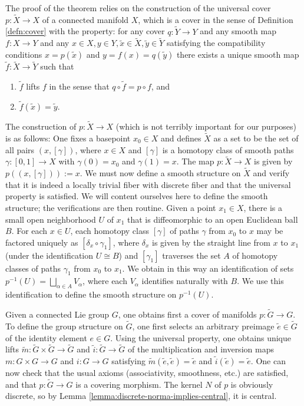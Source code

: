 \documentclass[reqno]{amsart} 
\begin{document}
The proof of the theorem relies on the construction of the universal cover $p : \tilde{X} \rightarrow X$ of a connected manifold $X$, which is a cover in the sense of Definition \ref{defn:cover} with the property: for any cover $q : \tilde{Y} \rightarrow Y$ and any smooth map $f : X \rightarrow Y$ and any $x \in X, y \in Y, \tilde{x} \in \tilde{X}, \tilde{y} \in \tilde{Y}$ satisfying the compatibility conditions $x = p(\tilde{x})$ and $y = f(x) = q(\tilde{y})$ there exists a unique smooth map $\tilde{f} : \tilde{X} \rightarrow \tilde{Y}$ such that
\begin{enumerate}
\item $\tilde{f}$ lifts $f$ in the sense that $q \circ \tilde{f} = p \circ f$, and
\item $\tilde{f}(\tilde{x}) = \tilde{y}$.
\end{enumerate}
The construction of $p : \tilde{X} \rightarrow X$ (which is not terribly important for our purposes) is as follows: One fixes a basepoint $x_0 \in X$ and defines $\tilde{X}$ as a set to be the set of all pairs $(x,[\gamma])$, where $x \in X$ and $[\gamma]$ is a homotopy class of smooth paths $\gamma : [0,1] \rightarrow X$ with $\gamma(0) = x_0$ and $\gamma(1) = x$.  The map $p : \tilde{X} \rightarrow X$ is given by $p((x,[\gamma])) := x$.  We must now define a smooth structure on $\tilde{X}$ and verify that it is indeed a locally trivial fiber with discrete fiber and that the universal property is satisfied.  We will content ourselves here to define the smooth structure; the verifications are then routine.  Given a point $x_1 \in X$, there is a small open neighborhood $U$ of $x_1$ that is diffeomorphic to an open Euclidean ball $B$.  For each $x \in U$, each homotopy class $[\gamma]$ of paths $\gamma$ from $x_0$ to $x$ may be factored uniquely as $[\delta_x \circ \gamma_1]$, where $\delta_x$ is given by the straight line from $x$ to $x_1$ (under the identification $U \cong B$) and $[\gamma_1]$ traverses the set $A$ of homotopy classes of paths $\gamma_1$ from $x_0$ to $x_1$.  We obtain in this way an identification of sets $p^{-1}(U) = \bigsqcup_{\alpha \in A} V_\alpha$, where each $V_\alpha$ identifies naturally with $B$.  We use this identification to define the smooth structure on $p^{-1}(U)$.

Given a connected Lie group $G$, one obtains first a cover of manifolds $p : \tilde{G} \rightarrow G$.  To define the group structure on $\tilde{G}$, one first selects an arbitrary preimage $\tilde{e} \in \tilde{G}$ of the identity element $e \in G$.  Using the universal property, one obtains unique lifts $\tilde{m} : \tilde{G} \times \tilde{G} \rightarrow \tilde{G}$ and $\tilde{i} : \tilde{G} \rightarrow \tilde{G}$ of the multiplication and inversion maps $m : G \times G \rightarrow G$ and $i : G \rightarrow G$ satisfying $\tilde{m}(\tilde{e},\tilde{e}) = \tilde{e}$ and $\tilde{i}(\tilde{e}) = \tilde{e}$.  One can now check that the usual axioms (associativity, smoothness, etc.)  are satisfied, and that $p : \tilde{G} \rightarrow G$ is a covering morphism.  The kernel $N$ of $p$ is obviously discrete, so by Lemma \ref{lemma:discrete-norma-implies-central}, it is central.
\end{document}
